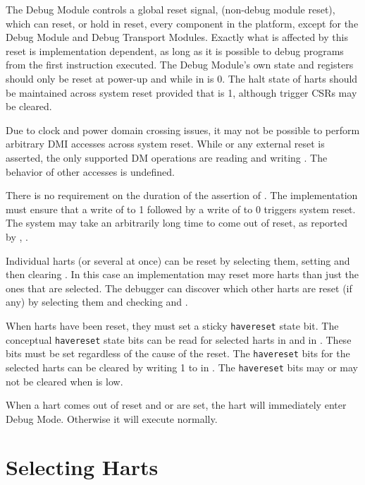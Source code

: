 The Debug Module controls a global reset signal, \Fndmreset
(non-debug module reset),
which can reset, or hold in reset, every component in the platform,
except for the Debug Module and Debug Transport Modules.
Exactly what is affected by this reset is implementation dependent, as long as
it is possible to debug programs from the first instruction executed.
The Debug Module's own state and registers should only be
reset at power-up and while
\Fdmactive in \Rdmcontrol is 0.
The halt state of harts should be
maintained across system reset provided that \Fdmactive is 1,
although trigger CSRs may be cleared.

Due to clock and power domain crossing issues,
it may not be possible to perform arbitrary DMI accesses across
system reset.
While \Fndmreset or any external reset is asserted, the only supported DM
operations are reading and writing \Rdmcontrol. The behavior of other accesses
is undefined.

There is no requirement on the duration of the assertion of \Fndmreset.
The implementation must ensure that a write of \Fndmreset to 1 followed by
a write of \Fndmreset to 0 triggers system reset. The system may take
an arbitrarily long time to come out of reset, as reported by \Fallunavail,
\Fanyunavail.

Individual harts (or several at once) can be reset by selecting them, setting
and then clearing \Fhartreset. In this case an implementation may reset more
harts than just the ones that are selected. The debugger can discover which
other harts are reset (if any) by selecting them and checking \Fanyhavereset
and \Fallhavereset.

When harts have been reset, they must set a sticky {\tt havereset} state bit.
The conceptual {\tt havereset} state bits can be read for selected harts in
\Fanyhavereset and \Fallhavereset in \Rdmstatus.
These bits must be set regardless of the cause of the reset.
The {\tt havereset} bits for the selected harts
can be cleared by writing 1 to \Fackhavereset in \Rdmcontrol.
The {\tt havereset} bits may or may not be cleared
when \Fdmactive is low.

When a hart comes out of reset and \Fhaltreq or \Fresethaltreq are set, the
hart will immediately enter Debug Mode. Otherwise it will execute normally.

\section{Selecting Harts} \label{selectingharts}

